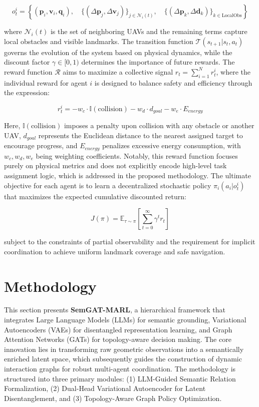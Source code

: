 \documentclass[conference]{IEEEtran}
\begin{document}
$$ o_t^i = \left\{ (\mathbf{p}_i, \mathbf{v}_i, \mathbf{q}_i), \quad \{(\Delta \mathbf{p}_j, \Delta \mathbf{v}_j)\}_{j \in \mathcal{N}_i(t)}, \quad \{(\Delta \mathbf{p}_k, \Delta \mathbf{d}_k)\}_{k \in \text{LocalObs}} \right\} $$

where $\mathcal{N}_i(t)$ is the set of neighboring UAVs and the remaining terms capture local obstacles and visible landmarks. The transition function $\mathcal{T}(s_{t+1} | s_t, a_t)$ governs the evolution of the system based on physical dynamics, while the discount factor $\gamma \in [0, 1)$ determines the importance of future rewards. The reward function $\mathcal{R}$ aims to maximize a collective signal $r_t = \sum_{i=1}^N r_t^i$, where the individual reward for agent $i$ is designed to balance safety and efficiency through the expression:

$$ r_t^i = -w_c \cdot \mathbb{I}(\text{collision}) - w_d \cdot d_{goal} - w_e \cdot E_{energy} $$

Here, $\mathbb{I}(\text{collision})$ imposes a penalty upon collision with any obstacle or another UAV, $d_{goal}$ represents the Euclidean distance to the nearest assigned target to encourage progress, and $E_{energy}$ penalizes excessive energy consumption, with $w_c, w_d, w_e$ being weighting coefficients. Notably, this reward function focuses purely on physical metrics and does not explicitly encode high-level task assignment logic, which is addressed in the proposed methodology. The ultimate objective for each agent is to learn a decentralized stochastic policy $\pi_i(a_i | o_t^i)$ that maximizes the expected cumulative discounted return:

$$ J(\pi) = \mathbb{E}_{\tau \sim \pi} \left[ \sum_{t=0}^{\infty} \gamma^t r_t \right] $$

subject to the constraints of partial observability and the requirement for implicit coordination to achieve uniform landmark coverage and safe navigation.

\section{Methodology}

This section presents \textbf{SemGAT-MARL}, a hierarchical framework that integrates Large Language Models (LLMs) for semantic grounding, Variational Autoencoders (VAEs) for disentangled representation learning, and Graph Attention Networks (GATs) for topology-aware decision making. The core innovation lies in transforming raw geometric observations into a semantically enriched latent space, which subsequently guides the construction of dynamic interaction graphs for robust multi-agent coordination. The methodology is structured into three primary modules: (1) LLM-Guided Semantic Relation Formalization, (2) Dual-Head Variational Autoencoder for Latent Disentanglement, and (3) Topology-Aware Graph Policy Optimization.
\end{document}
